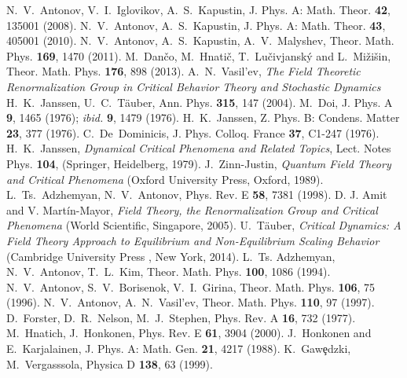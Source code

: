 \documentclass[12pt]{article}
\begin{document}
\begin{thebibliography}{99}
  N.~V.~Antonov, V.~I.~Iglovikov, A.~S.~Kapustin, J. Phys. A: Math. Theor. {\bf 42}, 135001 (2008).
  N.~V.~Antonov, A.~S.~Kapustin, J. Phys. A: Math. Theor. {\bf 43}, 405001 (2010).
  N.~V.~Antonov, A.~S.~Kapustin, A.~V.~Malyshev, Theor. Math. Phys. {\bf 169}, 1470 (2011).
  M.~Dan\v{c}o, M.~Hnati\v{c}, T.~Lu\v{c}ivjansk\'{y} and L.~Mi\v{z}i\v{s}in, Theor. Math. Phys. {\bf 176}, 898 (2013).
  A.~N.~Vasil'ev, {\it The Field Theoretic Renormalization Group in Critical Behavior Theory and Stochastic Dynamics}
  H.~K.~Janssen, U.~C.~T{\"a}uber, Ann. Phys. {\bf 315}, 147 (2004).
  M.~Doi, J. Phys. A {\bf 9}, 1465 (1976); {\it ibid.} {\bf 9}, 1479 (1976).        
  H.~K.~Janssen, Z. Phys. B: Condens. Matter {\bf 23}, 377 (1976).
  C.~De~Dominicis, J. Phys. Colloq. France {\bf 37}, C1-247 (1976).
  H.~K.~Janssen, {\it Dynamical Critical Phenomena and Related Topics},
    Lect. Notes Phys. {\bf 104}, (Springer, Heidelberg, 1979).
  J.~Zinn-Justin, \textit{Quantum Field Theory and Critical Phenomena} (Oxford University Press, Oxford, 1989).   
  L.~Ts.~Adzhemyan, N.~V.~Antonov, Phys. Rev. E {\bf 58}, 7381 (1998).   
  D. J. Amit and V. Mart\'in-Mayor, {\it Field Theory, the Renormalization Group and Critical Phenomena}
 (World Scientific, Singapore, 2005). 
  U.~T{\"a}uber, {\it Critical Dynamics: A Field Theory Approach to Equilibrium
 	      and Non-Equilibrium Scaling Behavior}
 	      (Cambridge University Press , New York, 2014).
  L.~Ts. Adzhemyan, N.~V.~Antonov, T.~L.~Kim, Theor. Math. Phys. {\bf 100}, 1086 (1994).
  N.~V.~Antonov, S.~V.~Borisenok, V.~I.~Girina, Theor. Math. Phys. {\bf 106}, 75 (1996).
  N.~V.~Antonov, A.~N.~Vasil'ev, Theor. Math. Phys. {\bf 110}, 97 (1997).
  D.~Forster, D.~R.~Nelson, M.~J.~Stephen, Phys. Rev. A {\bf 16}, 732 (1977).
  M.~Hnatich, J.~Honkonen, Phys. Rev. E {\bf 61}, 3904 (2000).
  J.~Honkonen and E.~Karjalainen, J. Phys. A: Math. Gen. {\bf 21}, 4217 (1988). 
  K.~Gaw{\c{e}}dzki, M.~Vergasssola, Physica D {\bf 138}, 63 (1999).
\end{thebibliography}
\end{document}
